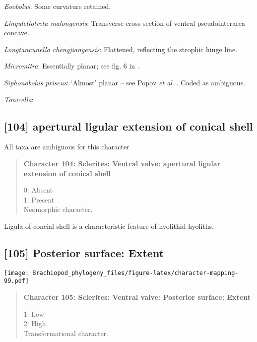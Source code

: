 \documentclass[openany]{book}
\theoremstyle{definition}
\theoremstyle{definition}
\theoremstyle{definition}
\theoremstyle{remark}
\begin{document}
\hypertarget{Eoobolus-coding-103}{}
\emph{Eoobolus}: Some curvature retained.

\hypertarget{Lingulellotreta_malongensis-coding-103}{}
\emph{Lingulellotreta malongensis}: Transverse cross section of ventral
pseudointerarea concave.

\hypertarget{Longtancunella_chengjiangensis-coding-103}{}
\emph{Longtancunella chengjiangensis}: Flattened, reflecting the
strophic hinge line.

\hypertarget{Micromitra-coding-103}{}
\emph{Micromitra}: Essentially planar; see fig. 6 in
\citet{Ushatinskaya2016Protegulumand}.

\hypertarget{Siphonobolus_priscus-coding-103}{}
\emph{Siphonobolus priscus}: `Almost' planar -- see Popov \emph{et al}.
\citeyearpar[fig. 4]{Popov2009Earlyontogeny}. Coded as ambiguous.

\hypertarget{Tonicella-coding-103}{}
\emph{Tonicella}: \citep{Schwabe2010}.

\subsection*{{[}104{]} apertural ligular extension of conical
shell}\label{apertural-ligular-extension-of-conical-shell}

All taxa are ambiguous for this character

\begin{quote}
\textbf{Character 104: Sclerites: Ventral valve: apertural ligular
extension of conical shell}

0: Absent\\
1: Present\\
Neomorphic character.
\end{quote}

Ligula of concial shell is a characteristic feature of hyolithid
hyoliths.

\subsection*{{[}105{]} Posterior surface:
Extent}\label{posterior-surface-extent}

\texttt{[image: Brachiopod\_phylogeny\_files/figure-latex/character-mapping-99.pdf]}

\begin{quote}
\textbf{Character 105: Sclerites: Ventral valve: Posterior surface:
Extent}

1: Low\\
2: High\\
Transformational character.
\end{quote}
\end{document}
